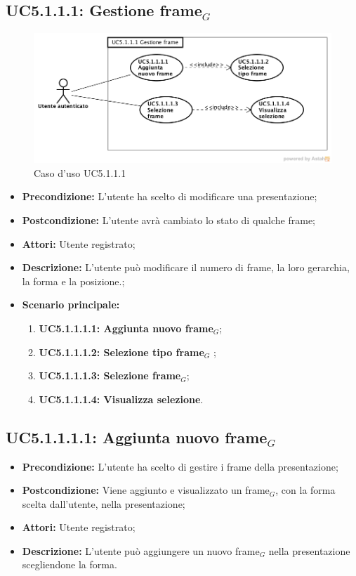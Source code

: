 \subsection{ UC5.1.1.1: Gestione frame$_G$}

\begin{figure}[h]
	\begin{center}
	\includegraphics[scale=0.4]{diagram/UC5-1-1-1.png}
	\caption{Caso d'uso UC5.1.1.1}
	\end{center}
\end{figure}
\begin{itemize}
	\item \textbf{Precondizione:} L'utente ha scelto di modificare una presentazione;
	\item \textbf{Postcondizione:} L'utente avrà cambiato lo stato di qualche frame;
	\item \textbf{Attori:} Utente registrato;
	\item \textbf{Descrizione:} L'utente può modificare il numero di frame, la loro gerarchia, la forma e la posizione.;
	\item \textbf{Scenario principale:}
	\begin{enumerate}
		\item \textbf{ UC5.1.1.1.1: Aggiunta nuovo frame$_G$};
		\item \textbf{ UC5.1.1.1.2: Selezione tipo frame$_G$ };
		\item \textbf{ UC5.1.1.1.3: Selezione frame$_G$};
		\item \textbf{ UC5.1.1.1.4: Visualizza selezione}.
	\end{enumerate}
\end{itemize}
\subsection{ UC5.1.1.1.1: Aggiunta nuovo frame$_G$}

\begin{itemize}
	\item \textbf{Precondizione:} L'utente ha scelto di gestire i frame della presentazione;
	\item \textbf{Postcondizione:} Viene aggiunto e visualizzato un frame$_G$, con la forma scelta dall'utente, nella presentazione;
	\item \textbf{Attori:} Utente registrato;
	\item \textbf{Descrizione:} L'utente può aggiungere un nuovo frame$_G$ nella presentazione scegliendone la forma.
\end{itemize}
